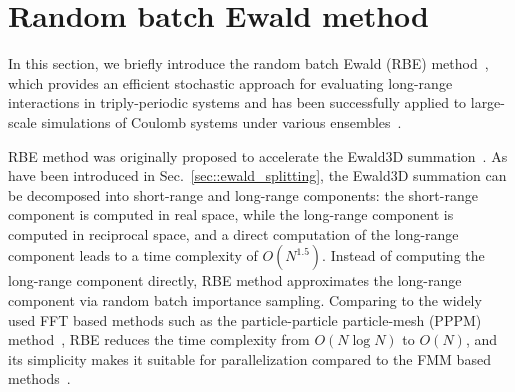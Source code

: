 \section{Random batch Ewald method}

In this section, we briefly introduce the random batch Ewald (RBE) method~\cite{jin2021random}, which provides an efficient stochastic approach for evaluating long-range interactions in triply-periodic systems and has been successfully applied to large-scale simulations of Coulomb systems under various ensembles~\cite{liang2022superscalability,liang2024JCP, liang2022random}.

RBE method was originally proposed to accelerate the Ewald3D summation~\cite{jin2021random}.
As have been introduced in Sec.~\ref{sec::ewald_splitting}, the Ewald3D summation can be decomposed into short-range and long-range components: the short-range component is computed in real space, while the long-range component is computed in reciprocal space, and a direct computation of the long-range component leads to a time complexity of $O(N^{1.5})$.
Instead of computing the long-range component directly, RBE method approximates the long-range component via random batch importance sampling.
Comparing to the widely used FFT based methods such as the particle-particle particle-mesh (PPPM) method~\cite{hockney2021computer,darden1993particle,essmann1995smooth}, RBE reduces the time complexity from $O(N\log N)$ to $O(N)$, and its simplicity makes it suitable for parallelization compared to the FMM based methods~\cite{greengard1987fast,cheng1999fast,ying2004kernel}.


